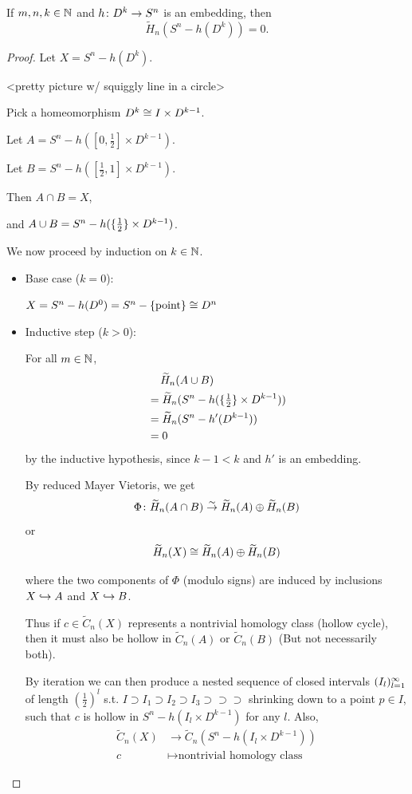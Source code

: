 \documentclass[11pt,leqno,oneside]{amsart}
\numberwithin{thm}{section}
\newcommand{\rhoml}[1][n]{\widetilde{H}_{#1}}
\newcommand{\rchains}[1][n]{\widetilde{C}_{#1}}
\newcommand{\x}{\times}
\begin{document}
\begin{thm}
  If $m, n, k \in {\mathbb N}$ and $h\colon D^k \to S^n$ is an embedding, then
  $$\rhoml(S^n - h(D^k)) = 0.$$
\end{thm}
\begin{proof}
  Let $X = S^n - h(D^k)$.

  <pretty picture w/ squiggly line in a circle>

  Pick a homeomorphism $D^k \isom I \x D^{k-1}$.

  Let $A = S^n - h([0, \tfrac 12] \x D^{k-1})$.

  Let $B = S^n - h([\tfrac 12, 1] \x D^{k-1})$.

  Then $A \cap B = X$,

  and $A \union B = S^n - h(\{\tfrac 12\} \x D^{k-1})$.

  We now proceed by induction on $k \in {\mathbb N}$.

  \begin{itemize}
    \item Base case ($k=0$):

    $X = S^n - h(D^0) = S^n - \{\text{point}\} \mathrel{\cong} D^n$

    \item Inductive step ($k>0$):

    For all $m \in {\mathbb N}$,
    \begin{align}
      &\quad\, \rhoml(A \union B) \\
      &= \rhoml(S^n - h(\{\tfrac 12\} \x D^{k-1})) \\
      &= \rhoml(S^n - h'(D^{k-1})) \\
      &= 0
    \end{align}
    by the inductive hypothesis, since $k-1 < k$ and $h'$ is an embedding.

    By reduced Mayer Vietoris, we get
    $$\Phi \from \rhoml(A \cap B) \isomto \rhoml(A) \dsum \rhoml(B)$$
    or
    $$\rhoml(X) \isom \rhoml(A) \dsum \rhoml(B)$$

    where the two components of $\Phi$ (modulo signs) are induced by inclusions $X \hookrightarrow A$ and $X \hookrightarrow B$.

    Thus if $c \in \rchains(X)$ represents a nontrivial homology class (hollow cycle), then it must also be hollow in $\rchains(A)$ or $\rchains(B)$ (But not necessarily both).

    By iteration we can then produce a nested sequence of closed intervals $(I_l)_{l=1}^{\infty}$ of length $(\tfrac 12)^l$ s.t. $I \supset I_1 \supset I_2 \supset I_3 \supset \supset \supset$ shrinking down to a point $p \in I$, such that $c$ is hollow in $S^n − h(I_l \x D^{k-1})$ for any $l$.  Also,
    \begin{align*}
      \rchains(X) &\to \rchains(S^n - h(I_l \x D^{k-1})) \\
      c &\mapsto \text{nontrivial homology class}
    \end{align*}


\end{itemize}
\end{proof}
\end{document}
